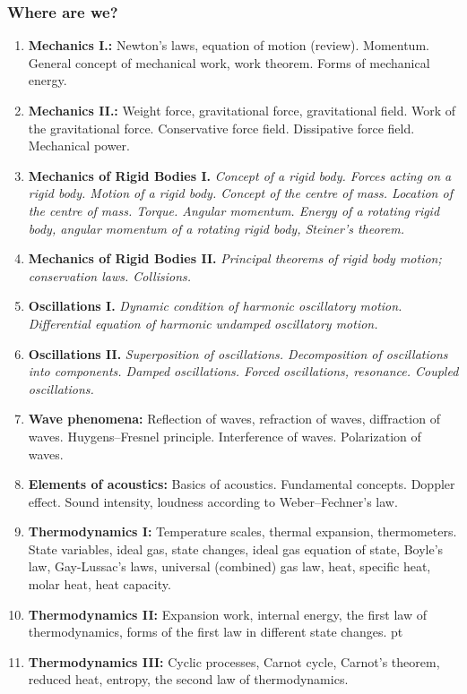 \documentclass[t,aspectratio=169]{beamer}
\begin{document}
\begin{frame}
\frametitle{Where are we?}
\begin{enumerate}
\setlength{\parskip}{0pt}
\setlength{\itemsep}{0pt}
\item \textbf{Mechanics I.:} Newton’s laws, equation of motion (review). Momentum. General concept of mechanical work, work theorem. Forms of mechanical energy.
\item \textbf{Mechanics II.:} Weight force, gravitational force, gravitational field. Work of the gravitational force. Conservative force field. Dissipative force field. Mechanical power.
\item \textbf{Mechanics of Rigid Bodies I.} \textit{Concept of a rigid body. Forces acting on a rigid body. Motion of a rigid body. Concept of the centre of mass. Location of the centre of mass. Torque. Angular momentum. Energy of a rotating rigid body, angular momentum of a rotating rigid body, Steiner’s theorem.}
\item \textbf{Mechanics of Rigid Bodies II.} \textit{Principal theorems of rigid body motion; conservation laws. Collisions.}
\item \textbf{Oscillations I.} \textit{Dynamic condition of harmonic oscillatory motion. Differential equation of harmonic undamped oscillatory motion.} 
\pagebreak
\item \textbf{Oscillations II.} \textit{Superposition of oscillations. Decomposition of oscillations into components. Damped oscillations. Forced oscillations, resonance. Coupled oscillations.}
\item \textbf{Wave phenomena:} Reflection of waves, refraction of waves, diffraction of waves. Huygens–Fresnel principle. Interference of waves. Polarization of waves.
\item \textbf{Elements of acoustics:} Basics of acoustics. Fundamental concepts. Doppler effect. Sound intensity, loudness according to Weber–Fechner’s law.
\item \textbf{Thermodynamics I:} Temperature scales, thermal expansion, thermometers. State variables, ideal gas, state changes, ideal gas equation of state, Boyle’s law, Gay-Lussac’s laws, universal (combined) gas law, heat, specific heat, molar heat, heat capacity.
\item \textbf{Thermodynamics II:} Expansion work, internal energy, the first law of thermodynamics, forms of the first law in different state changes.
\pagebreak
{} pt
\item \textbf{Thermodynamics III:} Cyclic processes, Carnot cycle, Carnot’s theorem, reduced heat, entropy, the second law of thermodynamics.

\end{enumerate}
\end{frame}
\end{document}
